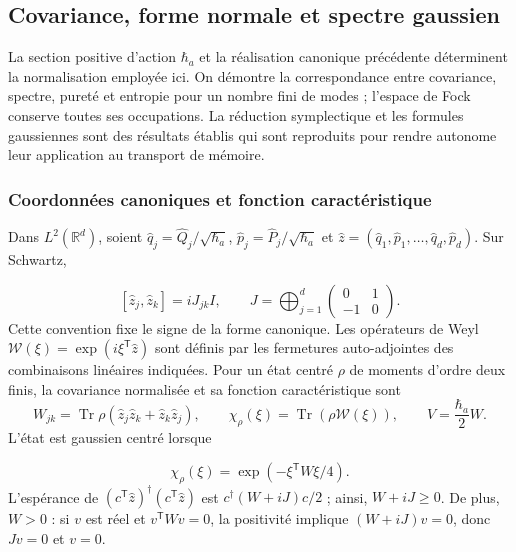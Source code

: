 \subsection{Covariance, forme normale et spectre gaussien}
\label{md:antmem:gauss:gaussianas-espectro}

La section positive d’action \(\hbar_a\) et la réalisation canonique
précédente déterminent la normalisation employée ici. On démontre la
correspondance entre covariance, spectre, pureté et entropie pour un
nombre fini de modes ; l’espace de Fock conserve toutes ses occupations.
La réduction symplectique et les formules gaussiennes sont des résultats
établis qui sont reproduits pour rendre autonome leur application au
transport de mémoire.

\subsubsection{Coordonnées canoniques et fonction caractéristique}
Dans \(L^2(\mathbb R^d)\), soient \(\widehat q_j=\widehat Q_j/\sqrt{\hbar_a}\),
\(\widehat p_j=\widehat P_j/\sqrt{\hbar_a}\) et
\(\widehat z=(\widehat q_1,\widehat p_1,\ldots,\widehat q_d,\widehat p_d)\).
Sur Schwartz,

\[
 [\widehat z_j,\widehat z_k]=iJ_{jk}I,\qquad
 J=\bigoplus_{j=1}^d\begin{pmatrix}0&1\\-1&0\end{pmatrix}.
\]
Cette convention fixe le signe de la forme canonique. Les opérateurs de
Weyl \(\mathcal W(\xi)=\exp(i\xi^{\mathsf T}\widehat z)\) sont définis
par les fermetures auto-adjointes des combinaisons linéaires indiquées.
Pour un état centré \(\rho\) de moments d’ordre deux finis, la
covariance normalisée et sa fonction caractéristique sont
\[
 W_{jk}=\operatorname{Tr}\rho(\widehat z_j\widehat z_k+\widehat z_k\widehat z_j),
 \qquad \chi_\rho(\xi)=\operatorname{Tr}(\rho\mathcal W(\xi)),\qquad
 V=\frac{\hbar_a}{2}W.
\]
L’état est gaussien centré lorsque

\begin{equation}
 \chi_\rho(\xi)=\exp(-\xi^{\mathsf T}W\xi/4).
 \label{md:antmem:gauss:eq:caracteristica-gaussiana}
\end{equation}
L’espérance de \((c^{\mathsf T}\widehat z)^\dagger
(c^{\mathsf T}\widehat z)\) est \(c^\dagger(W+iJ)c/2\) ; ainsi,
\(W+iJ\geq0\). De plus, \(W>0\) : si \(v\) est réel et
\(v^{\mathsf T}Wv=0\), la positivité implique \((W+iJ)v=0\),
donc \(Jv=0\) et \(v=0\).


